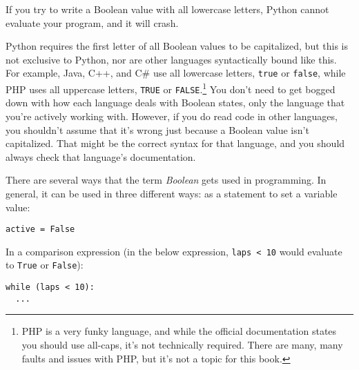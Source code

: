 If you try to write a Boolean value with all lowercase letters, Python cannot evaluate your program, and it will crash.\par
Python requires the first letter of all Boolean values to be capitalized, but this is not exclusive to Python, nor are other languages syntactically bound like this. For example, Java, C++, and C\# use all lowercase letters, \verb|true| or \verb|false|, while PHP uses all uppercase letters, \verb|TRUE| or \verb|FALSE|.\footnote{PHP is a very funky language, and while the official documentation states you should use all-caps, it's not technically required. There are many, many faults and issues with PHP, but it's not a topic for this book.} You don't need to get bogged down with how each language deals with Boolean states, only the language that you're actively working with. However, if you do read code in other languages, you shouldn't assume that it's wrong just because a Boolean value isn't capitalized. That might be the correct syntax for that language, and you should always check that language's documentation.\par
{}\par
There are several ways that the term \textit{Boolean} gets used in programming. In general, it can be used in three different ways: as a statement to set a variable value:

\begin{lstlisting}[style=pippython]
active = False
\end{lstlisting}

In a comparison expression (in the below expression, \verb|laps < 10| would evaluate to \verb|True| or \verb|False|):

\begin{lstlisting}[style=pippython]
while (laps < 10):
  ...
\end{lstlisting}


